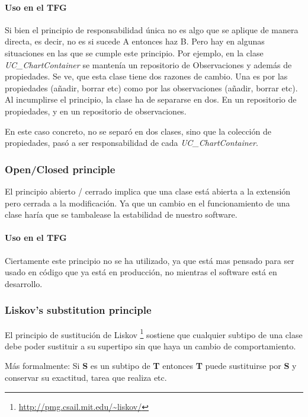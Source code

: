 \paragraph{Uso en el TFG}
Si bien el principio de responsabilidad \'unica no es algo que se aplique de manera directa, es decir,
no es si sucede A entonces haz B. Pero hay en algunas situaciones en las que se cumple este principio.
Por ejemplo, en la clase \emph{UC\_ChartContainer} se manten\'ia un repositorio de Observaciones
y adem\'as de propiedades. Se ve, que esta clase tiene dos razones de cambio. Una es por las propiedades
(a\~nadir, borrar etc) como por las observaciones (a\~nadir, borrar etc). Al incumplirse el principio,
la clase ha de separarse en dos. En un repositorio de propiedades, y en un repositorio de observaciones.

En este caso concreto, no se separ\'o en dos clases, sino que la colecci\'on de propiedades, pas\'o a ser
responsabilidad de cada \emph{UC\_ChartContainer}.

\subsubsection{Open/Closed principle}
El principio abierto / cerrado \cite{SOLID:OCP} implica que una clase est\'{a} abierta a la extensi\'{o}n pero cerrada a la 
modificaci\'{o}n. Ya que un cambio en el
funcionamiento de una clase har\'{i}a que se tambalease la estabilidad de nuestro software.

\paragraph{Uso en el TFG}
Ciertamente este principio no se ha utilizado, ya que est\'a mas pensado para ser usado en
c\'odigo que ya est\'a en producci\'on, no mientras el software est\'a en desarrollo.

\subsubsection{Liskov's substitution principle}
El principio de sustituci\'{o}n de Liskov \cite{SOLID:LSP} \footnote{\url{http://pmg.csail.mit.edu/~liskov/}} 
sostiene que cualquier subtipo de una clase
debe poder sustituir a su supertipo sin que haya un cambio de comportamiento.

M\'{a}s formalmente: Si \textbf{S} es un subtipo de \textbf{T} entonces \textbf{T} puede sustituirse por \textbf{S} y 
conservar su exactitud, tarea que realiza etc.

